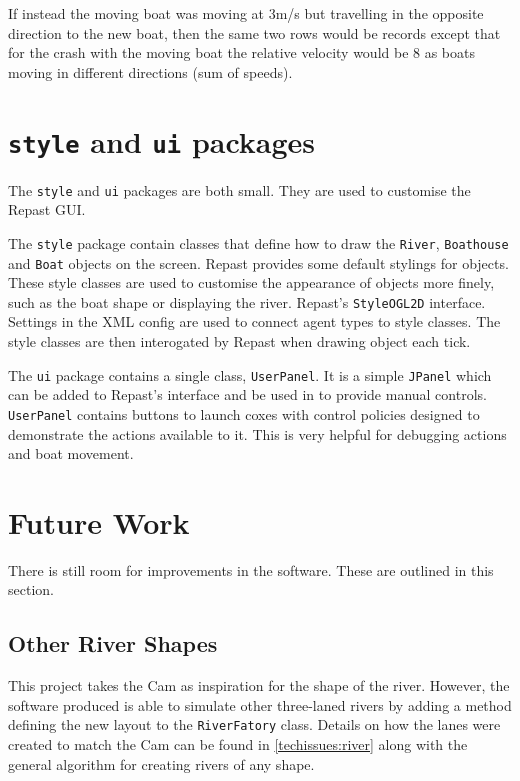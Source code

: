 If instead the moving boat was moving at 3m/s but travelling in the opposite direction to the new boat, then the same two rows would be records except that for the crash with the moving boat the relative velocity would be 8 as boats moving in different directions (sum of speeds).

\section{\texttt{style} and \texttt{ui} packages}
The \texttt{style} and \texttt{ui} packages are both small. They are used to customise the Repast
GUI. 

The \texttt{style} package contain classes
that define how to draw the \texttt{River}, \texttt{Boathouse} and \texttt{Boat} objects on the
screen. Repast provides some default stylings for objects. These style
classes are used to customise the appearance of objects more finely,
such as the boat shape or displaying the river.
Repast's \texttt{StyleOGL2D} interface. Settings in the XML config are used to
connect agent types to style classes. The style classes are then
interogated by Repast when drawing object each tick.

The \texttt{ui} package contains a single class, \texttt{UserPanel}. It is a simple \texttt{JPanel} which
can be added to Repast's interface and be used in to provide manual
controls. \texttt{UserPanel} contains buttons to launch coxes with control
policies designed to demonstrate the actions available to it. This is
very helpful for debugging actions and boat movement.

\section{Future Work}\label{software:future}
There is still room for improvements in the software. These are outlined in this section.

\subsection{Other River Shapes}
This project takes the Cam as inspiration for the shape of the river. However, the software produced is able to simulate other three-laned rivers by adding a method defining the new layout to the \texttt{RiverFatory} class. Details on how the lanes were created to match the Cam can be found in \ref{techissues:river} along with the general algorithm for creating rivers of any shape.

